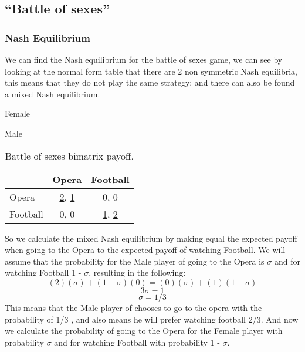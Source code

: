 \documentclass{book}
\begin{document}
\subsection{``Battle of sexes''}

\subsubsection{Nash Equilibrium}
We can find the Nash equilibrium for the battle of sexes game, we can see by looking at the normal form table that there are 2 non symmetric Nash equilibria, this means that they do not play the same strategy; and there can also be found a mixed Nash equilibrium.

\begin{table}[H]
\begin{center}
Female

Male
\begin{tabular}{|l|c|c|}
\hline
 & Opera & Football\\ 
\hline
Opera & \underline{2}, \underline{1} & 0, 0\\
\hline
Football & 0, 0 & \underline{1}, \underline{2}\\
\hline
\end{tabular}

\caption{ Battle of sexes bimatrix payoff.}
\label{fig:mpnashbos}	
\end{center}
\end{table}

So we calculate the mixed Nash equilibrium by making equal the expected payoff  when going to the Opera to the expected payoff of watching Football. We will assume that the probability for the Male player of going to the Opera is $\sigma$ and for watching Football 1 - $\sigma$, resulting in the following:
\begin{equation}
(2)(\sigma) + (1 - \sigma)(0) = (0)(\sigma) + (1)(1 - \sigma)
\end{equation}
\begin{equation}
3\sigma = 1
\end{equation}
\begin{equation}
\sigma = 1/3
\end{equation}
This means that the Male player of chooses to go to the opera with the probability of 1/3 , and also means he will prefer watching football 2/3. And now we calculate the probability of going to the Opera for the Female player with probability $\sigma$ and for watching Football with probability 1 - $\sigma$.
\end{document}
